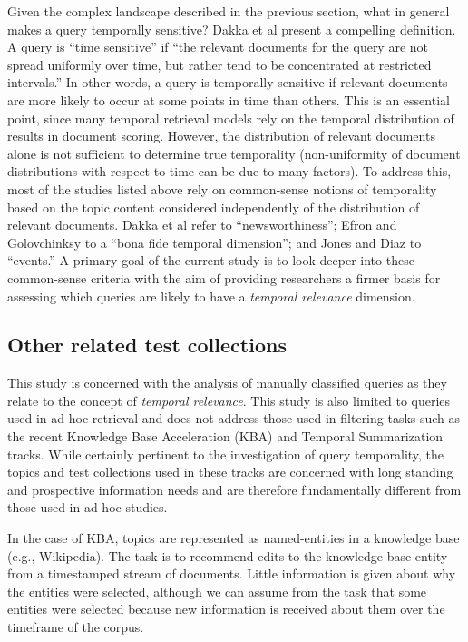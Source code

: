 \documentclass{sig-alternate}
\begin{document}
Given the complex landscape described in the previous section, what in general makes a query temporally sensitive? Dakka et al \cite{Dakka2012} present a compelling definition. A query is ``time sensitive''  if  ``the relevant documents for the query are not spread uniformly over time, but rather tend to be concentrated at restricted intervals.''  In other words, a query is temporally sensitive if relevant documents are more likely to occur at some points in time than others. This is an essential point, since many temporal retrieval models rely on the temporal distribution of results in document scoring. However, the distribution of relevant documents alone is not sufficient to determine true temporality (non-uniformity of document distributions with respect to time can be due to many factors). To address this, most of the studies listed above rely on common-sense notions of temporality based on the topic content considered independently of the distribution of relevant documents. Dakka et al refer to ``newsworthiness''; Efron and Golovchinksy to a ``bona fide temporal dimension''; and Jones and Diaz to ``events.''  A primary goal of the current study is to look deeper into these common-sense criteria with the aim of providing researchers a firmer basis for assessing which queries are likely to have a \emph{temporal relevance} dimension.


\subsection{Other related test collections}

This study is concerned with the analysis of manually classified queries as they relate to the concept of \emph{temporal relevance}. This study is also limited to queries used in ad-hoc retrieval and does not address those used in filtering tasks such as the recent Knowledge Base Acceleration (KBA) \cite{Frank2013} and Temporal Summarization \cite{Guo2013} tracks.  While certainly pertinent to the investigation of query temporality, the topics and test collections used in these tracks are concerned with long standing and prospective information needs and are therefore fundamentally different from those used in ad-hoc studies. 

In the case of KBA, topics are represented as named-entities in a knowledge base (e.g., Wikipedia). The task is to recommend edits to the knowledge base entity from a timestamped stream of documents.  Little information is given about why the entities were selected, although we can assume from the task that some entities were selected because new information is received about them over the timeframe of the corpus. 
\end{document}
